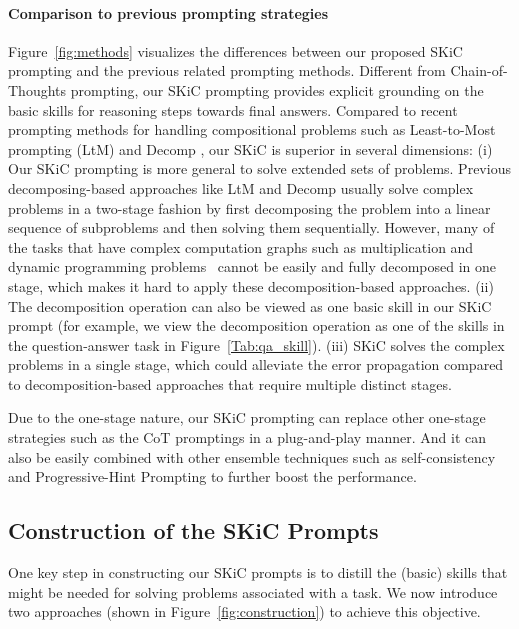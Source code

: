 \documentclass{article} \usepackage{arxiv}
\begin{document}
\paragraph{Comparison to previous prompting strategies}
Figure~\ref{fig:methods} visualizes the differences between our proposed SKiC prompting and the previous related prompting methods. Different from Chain-of-Thoughts prompting, our SKiC prompting provides explicit grounding on the basic skills for reasoning steps towards final answers. Compared to recent prompting methods for handling compositional problems such as Least-to-Most prompting (LtM) \citep{zhou2022least} and Decomp \citep{khot2022decomposed}, our SKiC is superior in several dimensions: (i) Our SKiC prompting is more general to solve extended sets of problems. Previous decomposing-based approaches like LtM and Decomp usually solve complex problems in a two-stage fashion by first decomposing the problem into a linear sequence of subproblems and then solving them sequentially. However, many of the tasks that have complex computation graphs such as multiplication and dynamic programming problems~\citep{dziri2023faith} cannot be easily and fully decomposed in one stage, which makes it hard to apply these decomposition-based approaches. (ii) The decomposition operation can also be viewed as one basic skill in our SKiC prompt (for example, we view the decomposition operation as one of the skills in the question-answer task in Figure~\ref{Tab:qa_skill}). (iii) SKiC solves the complex problems in a single stage, which could alleviate the error propagation compared to decomposition-based approaches that require multiple distinct stages.


Due to the one-stage nature, our SKiC prompting can replace other one-stage strategies such as the CoT promptings in a plug-and-play manner. And it can also be easily combined with other ensemble techniques such as self-consistency \citep{cot_wei_sc} and Progressive-Hint Prompting \citep{zheng2023progressive} to further boost the performance.




\subsection{Construction of the SKiC Prompts} \label{Sec:skic_construction}





One key step in constructing our SKiC prompts is to distill the (basic) skills that might be needed for solving problems associated with a task. We now introduce two approaches (shown in Figure~\ref{fig:construction}) to achieve this objective.
\end{document}
